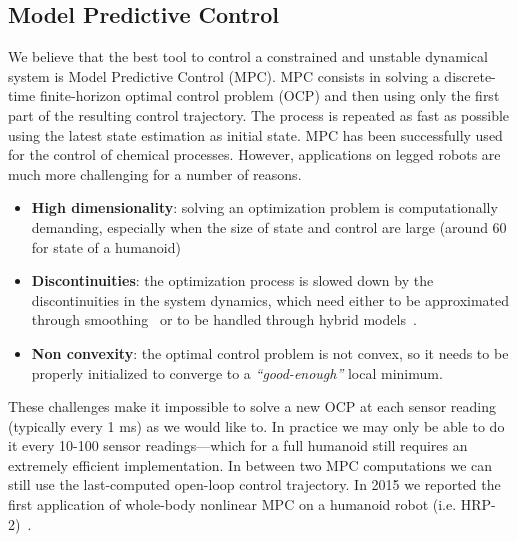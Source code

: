 \subsection{Model Predictive Control}
We believe that the best tool to control a constrained and unstable dynamical system is Model Predictive Control (MPC).
MPC consists in solving a discrete-time finite-horizon optimal control problem (OCP) and then using only the first part of the resulting control trajectory.
The process is repeated as fast as possible using the latest state estimation as initial state.
MPC has been successfully used for the control of chemical processes.
However, applications on legged robots are much more challenging for a number of reasons.
\begin{itemize}
\item \textbf{High dimensionality}: solving an optimization problem is computationally demanding, especially when the size of state and control are large (around 60 for state of a humanoid)
\item \textbf{Discontinuities}: the optimization process is slowed down by the discontinuities in the system dynamics, which need either to be approximated through smoothing~\citep{Todorov} or to be handled through hybrid models~\citep{Diehl2009a}.
\item \textbf{Non convexity}: the optimal control problem is not convex, so it needs to be properly initialized to converge to a \emph{``good-enough''} local minimum.
\end{itemize}
These challenges make it impossible to solve a new OCP at each sensor reading (typically every 1 ms) as we would like to. 
In practice we may only be able to do it every 10-100 sensor readings---which for a full humanoid still requires an extremely efficient implementation. 
In between two MPC computations we can still use the last-computed open-loop control trajectory.
In 2015 we reported the first application of whole-body nonlinear MPC on a humanoid robot (i.e. HRP-2)~\citep{Koenemann2015}.
